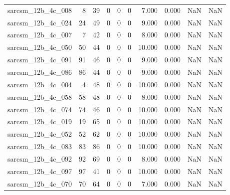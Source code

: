\documentclass{article}
\begin{document}
\begin{longtable}{lrrrrrrrrr}
sarcsm\_12b\_4c\_008 & 8 & 39 & 0 & 0 & 0 & 7.000 & 0.000 & NaN & NaN \\
sarcsm\_12b\_4c\_024 & 24 & 49 & 0 & 0 & 0 & 9.000 & 0.000 & NaN & NaN \\
sarcsm\_12b\_4c\_007 & 7 & 42 & 0 & 0 & 0 & 8.000 & 0.000 & NaN & NaN \\
sarcsm\_12b\_4c\_050 & 50 & 44 & 0 & 0 & 0 & 10.000 & 0.000 & NaN & NaN \\
sarcsm\_12b\_4c\_091 & 91 & 46 & 0 & 0 & 0 & 9.000 & 0.000 & NaN & NaN \\
sarcsm\_12b\_4c\_086 & 86 & 44 & 0 & 0 & 0 & 9.000 & 0.000 & NaN & NaN \\
sarcsm\_12b\_4c\_004 & 4 & 48 & 0 & 0 & 0 & 10.000 & 0.000 & NaN & NaN \\
sarcsm\_12b\_4c\_058 & 58 & 48 & 0 & 0 & 0 & 8.000 & 0.000 & NaN & NaN \\
sarcsm\_12b\_4c\_074 & 74 & 46 & 0 & 0 & 0 & 10.000 & 0.000 & NaN & NaN \\
sarcsm\_12b\_4c\_019 & 19 & 65 & 0 & 0 & 0 & 10.000 & 0.000 & NaN & NaN \\
sarcsm\_12b\_4c\_052 & 52 & 62 & 0 & 0 & 0 & 10.000 & 0.000 & NaN & NaN \\
sarcsm\_12b\_4c\_083 & 83 & 86 & 0 & 0 & 0 & 10.000 & 0.000 & NaN & NaN \\
sarcsm\_12b\_4c\_092 & 92 & 69 & 0 & 0 & 0 & 8.000 & 0.000 & NaN & NaN \\
sarcsm\_12b\_4c\_097 & 97 & 41 & 0 & 0 & 0 & 10.000 & 0.000 & NaN & NaN \\
sarcsm\_12b\_4c\_070 & 70 & 64 & 0 & 0 & 0 & 7.000 & 0.000 & NaN & NaN \\
\end{longtable}
\end{document}
